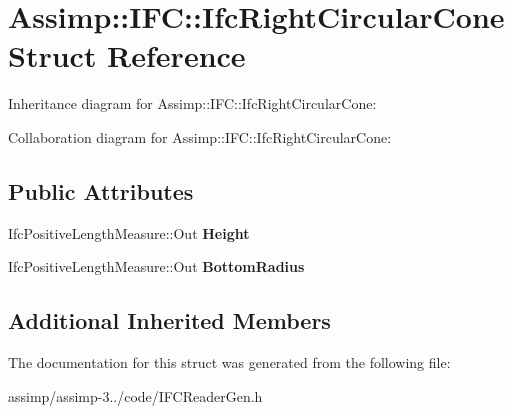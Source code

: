 \hypertarget{struct_assimp_1_1_i_f_c_1_1_ifc_right_circular_cone}{\section{Assimp\+:\+:I\+F\+C\+:\+:Ifc\+Right\+Circular\+Cone Struct Reference}
\label{struct_assimp_1_1_i_f_c_1_1_ifc_right_circular_cone}
}


Inheritance diagram for Assimp\+:\+:I\+F\+C\+:\+:Ifc\+Right\+Circular\+Cone\+:


Collaboration diagram for Assimp\+:\+:I\+F\+C\+:\+:Ifc\+Right\+Circular\+Cone\+:
\subsection*{Public Attributes}
\begin{DoxyCompactItemize}
\item 
\hypertarget{struct_assimp_1_1_i_f_c_1_1_ifc_right_circular_cone_a18378597f9a6e32192ce932c967c0b39}{Ifc\+Positive\+Length\+Measure\+::\+Out {\bfseries Height}}\label{struct_assimp_1_1_i_f_c_1_1_ifc_right_circular_cone_a18378597f9a6e32192ce932c967c0b39}

\item 
\hypertarget{struct_assimp_1_1_i_f_c_1_1_ifc_right_circular_cone_a0489739dfc0a061856867f7c7fb95cc3}{Ifc\+Positive\+Length\+Measure\+::\+Out {\bfseries Bottom\+Radius}}\label{struct_assimp_1_1_i_f_c_1_1_ifc_right_circular_cone_a0489739dfc0a061856867f7c7fb95cc3}

\end{DoxyCompactItemize}
\subsection*{Additional Inherited Members}


The documentation for this struct was generated from the following file\+:\begin{DoxyCompactItemize}
\item 
assimp/assimp-\/3../code/I\+F\+C\+Reader\+Gen.\+h\end{DoxyCompactItemize}
